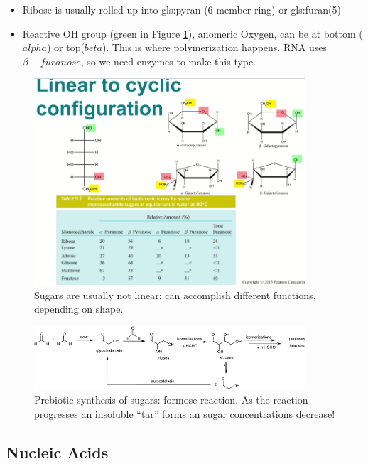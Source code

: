 \documentclass[]{article}
\begin{document}
\begin{itemize}
	\item Ribose is usually rolled up into \gls{gls:pyran} (6 member ring) or \gls{gls:furan}(5)
	\item Reactive OH group (green in Figure \ref{fig:SugarTautomers}), anomeric Oxygen, can be at bottom ($alpha$) or top($beta$). This is where polymerization happens. RNA uses $\beta-furanose$, so we need enzymes to make this type.
\end{itemize}
\begin{figure}[H]
	\caption{Sugars are usually not linear: can accomplish different functions, depending on shape.}\label{fig:SugarTautomers} 
	\includegraphics[width=0.9\textwidth]{SugarTautomers}
\end{figure}

\begin{figure}[H]
	\caption{Prebiotic synthesis of sugars: formose reaction. As the reaction progresses an insoluble “tar” forms an sugar concentrations decrease!}\label{fig:SugarsPrebioticSynthesis} 
	\includegraphics[width=0.9\textwidth]{SugarsPrebioticSynthesis}
\end{figure}

\subsection{Nucleic Acids}
\end{document}
